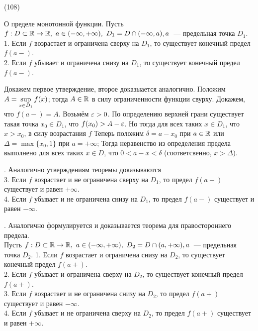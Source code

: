 (108)

\T \q О пределе монотонной функции. Пусть $f: D\subset \mathbb{R}\to\mathbb{R},\ a \in (-\infty, +\infty),\ D_1 = D\cap(-\infty, a), a$~--- предельная точка $D_1$.\\
1. Если $f$ возрастает и ограничена сверху на $D_1$, то существует конечный предел $f(a-)$.\\
2. Если $f$ убывает и ограничена снизу на $D_1$, то существует конечный предел $f(a-)$.

\D Докажем первое утверждение, второе доказыается аналогично. Положим $A = \displaystyle \sup\limits^{}_{x\in D_1} f(x)$; тогда $A \in \mathbb{R}$ в силу ограниченности функции свурху. Докажем, что $f(a-) = A$. Возьмём $\varepsilon > 0$. По определению верхней грани существует такая точка $x_0 \in D_1$, что $f(x_0) > A - \varepsilon$. Но тогда для всех таких $x\in D_1$, что $x > x_0$, в силу возрастания $f$  Теперь положим $\delta = a - x_0$ при $a \in \mathbb{R}$ или $\Delta = \max\{x_0, 1\}$ при $a = +\infty$; Тогда неравенство из определения предела выполнено для всех таких $x \in D$, что $0 < a - x < \delta$ (соответсвенно, $x > \Delta$).

. Аналогично утверждениям теоремы доказываются\\
3. Если $f$ возрастает и не ограничена сверху на $D_1$, то предел $f(a-)$ существует и равен $+\infty$.\\
4. Если $f$ убывает и не ограничена снизу на $D_1$, то предел $f(a-)$ существует и равен $-\infty$.

. Аналогично формулируется и доказывается теорема для правостороннего предела.\\
Пусть $f: D\subset \mathbb{R}\to\mathbb{R},\ a \in (-\infty, +\infty),\ D_2 = D\cap(a, +\infty), a$~--- предельная точка $D_2$.
1. Если $f$ возрастает и ограничена снизу на $D_2$, то существует конечный предел $f(a+)$.\\
2. Если $f$ убывает и ограничена сверху на $D_2$, то существует конечный предел $f(a+)$.\\
3. Если $f$ возрастает и не ограничена снизу на $D_2$, то предел $f(a+)$ существует и равен $-\infty$.\\
4. Если $f$ убывает и не ограничена сверху на $D_2$, то предел $f(a+)$ существует и равен $+\infty$.